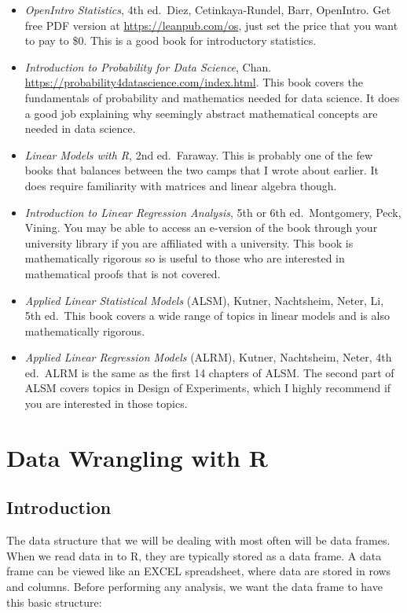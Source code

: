\documentclass[
]{book}
\begin{document}
\begin{itemize}
\item
  \emph{OpenIntro Statistics}, 4th ed.~Diez, Cetinkaya-Rundel, Barr, OpenIntro. Get free PDF version at \url{https://leanpub.com/os}, just set the price that you want to pay to \$0. This is a good book for introductory statistics.
\item
  \emph{Introduction to Probability for Data Science}, Chan. \url{https://probability4datascience.com/index.html}. This book covers the fundamentals of probability and mathematics needed for data science. It does a good job explaining why seemingly abstract mathematical concepts are needed in data science.
\item
  \emph{Linear Models with R}, 2nd ed.~Faraway. This is probably one of the few books that balances between the two camps that I wrote about earlier. It does require familiarity with matrices and linear algebra though.
\item
  \emph{Introduction to Linear Regression Analysis}, 5th or 6th ed.~Montgomery, Peck, Vining. You may be able to access an e-version of the book through your university library if you are affiliated with a university. This book is mathematically rigorous so is useful to those who are interested in mathematical proofs that is not covered.
\item
  \emph{Applied Linear Statistical Models} (ALSM), Kutner, Nachtsheim, Neter, Li, 5th ed.~This book covers a wide range of topics in linear models and is also mathematically rigorous.
\item
  \emph{Applied Linear Regression Models} (ALRM), Kutner, Nachtsheim, Neter, 4th ed.~ALRM is the same as the first 14 chapters of ALSM. The second part of ALSM covers topics in Design of Experiments, which I highly recommend if you are interested in those topics.
\end{itemize}

\hypertarget{wrangling}{%
\chapter{Data Wrangling with R}\label{wrangling}}

\hypertarget{introduction}{%
\section{Introduction}\label{introduction}}

The data structure that we will be dealing with most often will be data frames. When we read data in to R, they are typically stored as a data frame. A data frame can be viewed like an EXCEL spreadsheet, where data are stored in rows and columns. Before performing any analysis, we want the data frame to have this basic structure:
\end{document}
